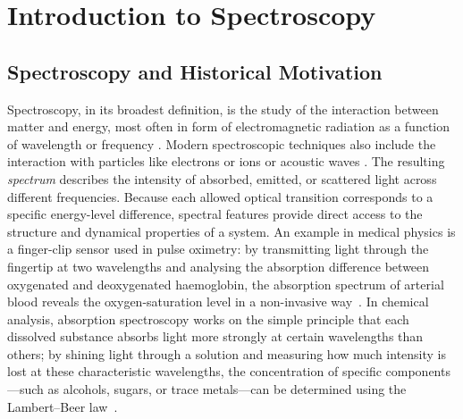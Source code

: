 \chapter{Introduction to Spectroscopy}
\label{final:chapter_spectroscopy}

\section{Spectroscopy and Historical Motivation}
\label{final:sec:history}

\noindent
Spectroscopy, in its broadest definition, is the study of the interaction between matter and energy, most often in form of electromagnetic radiation as a function of wavelength or frequency \cite{berman2011principleslaserspectroscopy, mukamel1995principlesnonlinearoptical}. Modern spectroscopic techniques also include the interaction with particles like electrons or ions or acoustic waves \cite{skoogetal2017principlesinstrumentalanalysis}.
The resulting \emph{spectrum} describes the intensity of absorbed, emitted, or scattered light across different frequencies. Because each allowed optical transition corresponds to a specific energy-level difference, spectral features provide direct access to the structure and dynamical properties of a system. An example in medical physics is a finger-clip sensor used in pulse oximetry: by transmitting light through the fingertip at two wavelengths and analysing the absorption difference between oxygenated and deoxygenated haemoglobin, the absorption spectrum of arterial blood reveals the oxygen-saturation level in a non-invasive way~\cite{nitzanetal2014pulseoximetryfundamentals}.
In chemical analysis, absorption spectroscopy works on the simple principle that each dissolved substance absorbs light more strongly at certain wavelengths than others; by shining light through a solution and measuring how much intensity is lost at these characteristic wavelengths, the concentration of specific components---such as alcohols, sugars, or trace metals---can be determined using the Lambert--Beer law~\cite {skoogetal2017principlesinstrumentalanalysis}.

